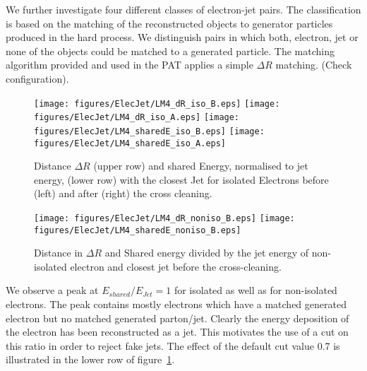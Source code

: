 \documentclass{cmspaper}
\begin{document}
We further investigate four different classes of electron-jet pairs. The
classification is based on the matching of the reconstructed objects
to generator particles produced in the hard process. We distinguish pairs in
which both, electron, jet or none of the objects could be matched to a generated
particle. The matching algorithm provided and used in the PAT applies a simple
$\Delta R$ matching. {\color{red}(Check configuration)}.

\begin{figure}[hb]
\begin{center}
    \texttt{[image: figures/ElecJet/LM4\_dR\_iso\_B.eps]}
    \texttt{[image: figures/ElecJet/LM4\_dR\_iso\_A.eps]}
    \texttt{[image: figures/ElecJet/LM4\_sharedE\_iso\_B.eps]}
    \texttt{[image: figures/ElecJet/LM4\_sharedE\_iso\_A.eps]}
    \caption{Distance \(\Delta R\) (upper row) and shared Energy, normalised to jet energy, (lower row) with the closest Jet for isolated Electrons before (left) and after (right) the cross cleaning.}
\label{fig:dR_sE_ElecJet_iso}
\end{center}
\end{figure}

\begin{figure}[hb]
\begin{center}
    \texttt{[image: figures/ElecJet/LM4\_dR\_noniso\_B.eps]}
    \texttt{[image: figures/ElecJet/LM4\_sharedE\_noniso\_B.eps]}
    \caption{Distance in $\Delta R$ and Shared energy divided by the jet energy of non-isolated electron and closest jet
before the cross-cleaning.}
\label{fig:dR_sE_ElecJet_noniso}
\end{center}
\end{figure}

We observe a peak at $E_{shared}/E_{Jet}=1$ for isolated as well as for
non-isolated electrons. The peak contains mostly electrons which have a matched
generated electron but no matched generated parton/jet. Clearly the energy
deposition of the electron has been reconstructed as a jet. This motivates the
use of a cut on this ratio in order to reject fake jets. The effect of the
default cut value 0.7 is illustrated in the lower row of figure~\ref{fig:dR_sE_ElecJet_iso}.
\end{document}
